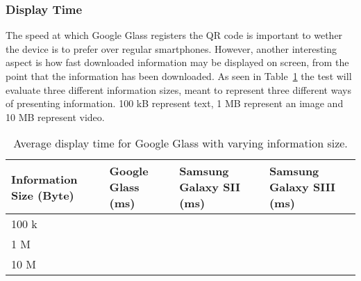 \subsubsection{Display Time}
The speed at which Google Glass registers the QR code is important to wether the device is to prefer over regular smartphones. However, another interesting aspect is how fast downloaded information may be displayed on screen, from the point that the information has been downloaded. As seen in Table~\ref{tab:averageDisplaySpeedGoogleGlass} the test will evaluate three different information sizes, meant to represent three different ways of presenting information. 100 kB represent text, 1 MB represent an image and 10 MB represent video.

	\begin{table}[ht!]
    		\caption{Average display time for Google Glass with varying information size.} \label{tab:averageDisplaySpeedGoogleGlass}
		\centering \begin{tabularx}{\textwidth}{l|X|X|X} \hline
		\textbf{Information Size (Byte)} & \textbf{Google Glass (ms)}  & \textbf{Samsung Galaxy SII (ms)}  & \textbf{Samsung Galaxy SIII (ms)} \\ \hline \hline
       
		100 k	&	&	&	 \\ \hline
		1 M		&	&	&	 \\ \hline
		10 M		&	&	&	 \\ \hline

		\end{tabularx}
	\end{table}














